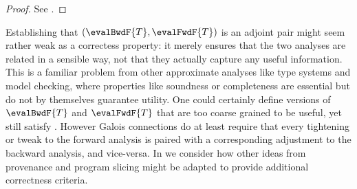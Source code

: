 \begin{proof}
   \ifappendices See . \else \ProofInSupplementaryMaterial \fi
\end{proof}

Establishing that $(\evalBwdF{T}, \evalFwdF{T})$ is an adjoint pair might seem rather weak as a correctess property: it merely ensures that the two analyses are related in a sensible way, not that they actually capture any useful information. This is a familiar problem from other approximate analyses like type systems and model checking, where properties like soundness or completeness are essential but do not by themselves guarantee utility. One could certainly define versions of $\evalBwdF{T}$ and $\evalFwdF{T}$ that are too coarse grained to be useful, yet still satisfy . However Galois connections do at least require that every tightening or tweak to the forward analysis is paired with a corresponding adjustment to the backward analysis, and vice-versa. In  we consider how other ideas from provenance and program slicing might be adapted to provide additional correctness criteria.
